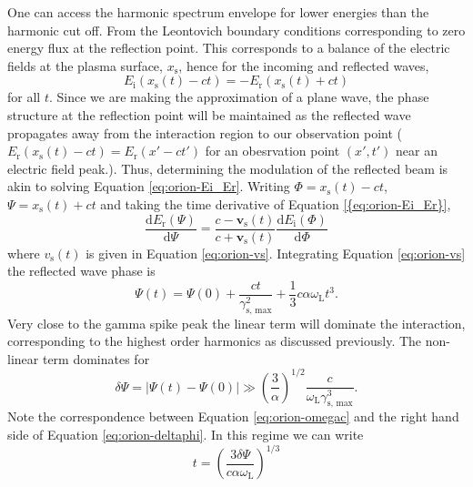 One can access the harmonic spectrum envelope for lower energies than the harmonic cut off. From the Leontovich boundary conditions
corresponding to zero energy flux at the reflection point.
This corresponds to a balance of the electric fields at the plasma surface, $x_\mathrm{s}$, hence for the incoming and reflected waves,
\begin{equation}\label{eq:orion-Ei_Er}
	E_\mathrm{i}(x_\mathrm{s}(t) - ct) = - E_\mathrm{r}(x_\mathrm{s}(t) + ct)
\end{equation}
for all $t$. Since we are making the approximation of a plane wave, the phase structure at the reflection point will be maintained as the reflected wave propagates away from the interaction region to our observation point ($E_\mathrm{r}(x_\mathrm{s}(t) - ct) = E_\mathrm{r}(x' - ct')$ for an obesrvation point $(x',t')$ near an electric field peak.). Thus, determining the modulation of the reflected beam is akin to solving Equation \ref{eq:orion-Ei_Er}. Writing $\Phi = x_\mathrm{s}(t) - ct$, $\Psi = x_\mathrm{s}(t) + ct$ and taking the time derivative of Equation \ref{{eq:orion-Ei_Er}},
\begin{equation}
	\frac{\mathrm{d}E_\mathrm{r}(\Psi)}{\mathrm{d}\Psi} = \frac{c - \mathbf{v}_\mathrm{s}(t)}{c+\mathbf{v}_\mathrm{s}(t)}\frac{\mathrm{d}E_\mathrm{i}(\Phi)}{\mathrm{d}\Phi}
\end{equation}
where $v_\mathrm{s}(t)$ is given in Equation \ref{eq:orion-vs}. Integrating Equation \ref{eq:orion-vs} the reflected wave phase is
\begin{equation}
	\Psi(t) = \Psi(0) + \frac{ct}{\gamma_\mathrm{s,\, max}^2} + \frac{1}{3}c\alpha \omega_\mathrm{L}t^3.
\end{equation}
Very close to the gamma spike peak the linear term will dominate the interaction, corresponding to the highest order harmonics as discussed previously. The non-linear term dominates for 
\begin{equation}\label{eq:orion-deltaphi}
	\delta \Psi = |\Psi(t) - \Psi(0)| \gg \left(\frac{3}{\alpha}\right)^{1/2}\frac{c}{\omega_\mathrm{L}\gamma_\mathrm{s,\, max}^3}.
\end{equation}
Note the correspondence between Equation \ref{eq:orion-omegac} and the right hand side of Equation \ref{eq:orion-deltaphi}. In this regime we can write
\begin{equation}
	t = \left(\frac{3\delta \Psi }{c\alpha \omega_\mathrm{L}}\right)^{1/3}
\end{equation}

